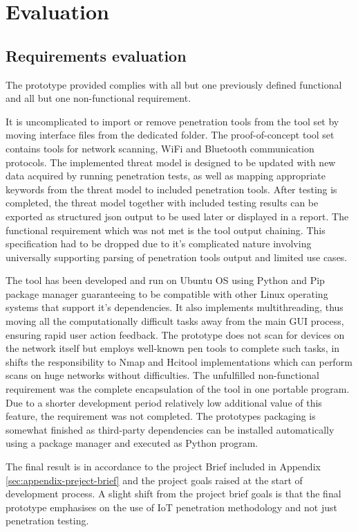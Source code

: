 \section{Evaluation}
	
	\subsection{Requirements evaluation}
	The prototype provided complies with all but one previously defined functional and all but one non-functional requirement. 
	
	It is uncomplicated to import or remove penetration tools from the tool set by moving interface files from the dedicated folder. The proof-of-concept tool set contains tools for network scanning, WiFi and Bluetooth communication protocols. The implemented threat model is designed to be updated with new data acquired by running penetration tests, as well as mapping appropriate keywords from the threat model to included penetration tools. After testing is completed, the threat model together with included testing results can be exported as structured json output to be used later or displayed in a report. 
	The functional requirement which was not met is the tool output chaining. This specification had to be dropped due to it's complicated nature involving universally supporting parsing of penetration tools output and limited use cases.
	
	The tool has been developed and run on Ubuntu OS using Python and Pip package manager guaranteeing to be compatible with other Linux operating systems that support it's dependencies. It also implements multithreading, thus moving all the computationally difficult tasks away from the main GUI process, ensuring rapid user action feedback. The prototype does not scan for devices on the network itself but employs well-known pen tools to complete such tasks, in shifts the responsibility to Nmap and Hcitool implementations which can perform scans on huge networks without difficulties. 
	The unfulfilled non-functional requirement was the complete encapsulation of the tool in one portable program. Due to a shorter development period relatively low additional value of this feature, the requirement was not completed. The prototypes packaging is somewhat finished as third-party dependencies can be installed automatically using a package manager and executed as Python program.
	
	The final result is in accordance to the project Brief included in Appendix \ref{sec:appendix-preject-brief} and the project goals raised at the start of development process. A slight shift from the project brief goals is that the final prototype emphasises on the use of IoT penetration methodology and not just penetration testing.
	\newpage
